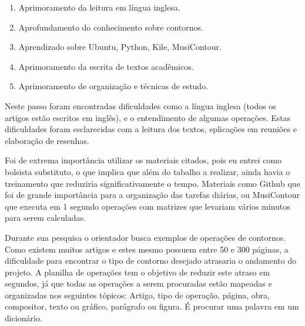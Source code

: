 \documentclass[11pt]{article}
\begin{document}
\begin{enumerate}
\item Aprimoramento da leitura em língua inglesa.
\item Aprofundamento do conhecimento sobre contornos.
\item Aprendizado sobre Ubuntu, Python, Kile, MusiContour.
\item Aprimoramento da escrita de textos acadêmicos.
\item Aprimoramento de organização e técnicas de estudo.
\end{enumerate}


\label{sec:discussao}
  

  Neste passo foram encontradas dificuldades como a língua inglesa (todos
os artigos estão escritos em inglês), e o entendimento de algumas operações. Estas dificuldades
foram esclarecidas com a leitura dos textos, eplicações em reuniões e elaboração de resenhas.

Foi de extrema importância utilizar os materiais citados, pois eu entrei como bolsista 
substituto, o que implica que além do tabalho a realizar, ainda havia o treinamento
que reduziria significativamente o tempo. Materiais como Github que foi de grande importância 
para a organização das tarefas diárias, ou MusiContour que executa em 1 segundo operações
com matrizes que levariam vários minutos para serem calculadas.

Durante sua pesquisa o orientador busca exemplos de operações de contornos. Como existem
muitos artigos e estes mesmo possuem entre 50 e 300 páginas, a dificuldade para encontrar
o tipo de contorno desejado atrasaria o andamento do projeto. A planilha de operações tem o
objetivo de reduzir este atraso em segundos, já que todas as operações a serem procuradas
estão mapeadas e organizadas nos seguintes tópicos: Artigo, tipo de operação, página, obra, 
compositor, texto ou gráfico, parágrafo ou figura. É procurar uma palavra em um dicionário.
\end{document}
